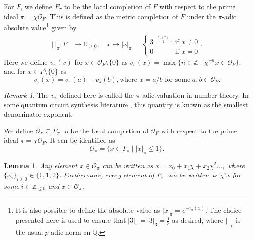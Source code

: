 \documentclass{eptcs}
\newtheorem{lemma}[theorem]{Lemma}
\theoremstyle{remark}
\newtheorem{remark}[theorem]{Remark}
\theoremstyle{definition}
\begin{document}
For $F$, we define $F_{\pi}$ to be the local completion of $F$ with respect to the prime ideal $ \pi = \chi \mathcal{O}_{F}$. This is defined as the metric completion of $F$ 
under the $\pi$-adic absolute value\footnote{It is also possible to define the absolute value as $|x|_{\pi} = e^{-v_{\pi}(x)}$. 
The choice presented here is used to ensure that $|3|_{\pi} = |3|_{3} = \tfrac{1}{3}$ as desired, where $|\ |_{p}$ is the usual $p$-adic norm on $\mathbb{Q}$.}
given by 
\begin{align}
	| \ |_{\pi} :F & \to \mathbb{R}_{\geq 0} , \quad
	x \mapsto |x|_{\pi} = 
	\begin{cases}
	3^{-\frac{{v_{\pi}(x)}}{2}} 
	& \text{if }  x \neq 0\\
	 0 & \text{if }x = 0
	\end{cases}
	. 
\end{align}
Here we define $v_{\pi}(x)$ for $x \in \mathcal{O}_{F} \setminus \{0\}$ as $
v_{\pi}(x) = \max\{ n \in \mathbb{Z} \mid \chi^{-n}x \in \mathcal{O}_{F}\},$
and for $x \in F \setminus \{0\}$ as
\begin{equation}
    v_{\pi}(x) = v_\pi(a) - v_{\pi}(b), \text{where }x=a/b \text{ for some }a,b \in \mathcal{O}_{F}.
\end{equation}

\begin{remark}
\label{re:sde}
The $v_{\pi}$ defined here is called the $\pi$-adic valuation in number theory. In some quantum circuit synthesis literature \cite{Kalra2025synthesisarithmetic,kmm}, this quantity is known as the smallest denominator exponent.
\end{remark}


We define $\mathcal{O}_{\pi} \subseteq F_{\pi}$ to be the local completion of $\mathcal{O}_F$ with respect to the prime ideal $ \pi = \chi \mathcal{O}_F$. It can be identified as 
\begin{equation}
  \mathcal{O}_{\pi} = \{x \in F_{\pi} \mid |x|_{\pi} \leq 1 \}.
\end{equation}


\begin{lemma}
  \label{le:padic_expansion}
  Any element $x \in \mathcal{O}_{\pi}$ can be written as 
  $
      x = x_{0}  + x_{1}  \chi + x_{2} \chi^{2} \dots,
  $
  where $\{x_{i}\}_{i \geq 0} \in \{0,1,2\}$. Furthermore, every element of $F_{\pi}$ can be written as $\chi^{i} x$ for some $i \in \mathbb{Z}_{\leq 0}$ and $x \in \mathcal{O}_{\pi}$.
\end{lemma}
\end{document}
